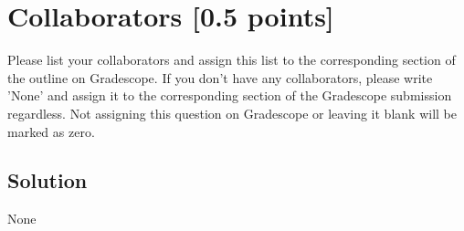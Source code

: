 \documentclass[11pt,english]{article}
\begin{document}
\newpage
\section{Collaborators [0.5 points]}
Please list your collaborators and assign this list to the corresponding section of the outline on Gradescope. If you don't have any collaborators, please write 'None' and assign it to the corresponding section of the Gradescope submission regardless. Not assigning this question on Gradescope or leaving it blank will be marked as zero.

\subsection*{Solution}

None

\newpage
\end{document}

